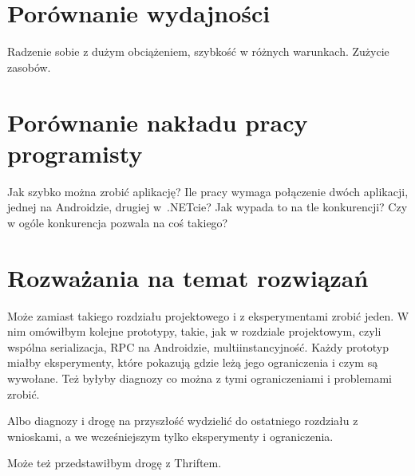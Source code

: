 
\section{Porównanie wydajności}
Radzenie sobie z dużym obciążeniem, szybkość w różnych warunkach. Zużycie zasobów.

\section{Porównanie nakładu pracy programisty}
Jak szybko można zrobić aplikację? Ile pracy wymaga połączenie dwóch aplikacji, jednej na Androidzie, drugiej w~.NETcie? Jak wypada to na tle konkurencji? Czy w ogóle konkurencja pozwala na coś takiego?



\section{Rozważania na temat rozwiązań}
Może zamiast takiego rozdziału projektowego i z eksperymentami zrobić jeden.
W nim omówiłbym kolejne prototypy, takie, jak w rozdziale projektowym, czyli wspólna serializacja, RPC na Androidzie, multiinstancyjność.
Każdy prototyp miałby eksperymenty, które pokazują gdzie leżą jego ograniczenia i czym są wywołane. Też byłyby diagnozy co można z tymi ograniczeniami i problemami zrobić.

Albo diagnozy i drogę na przyszłość wydzielić do ostatniego rozdziału z wnioskami, a we wcześniejszym tylko eksperymenty i ograniczenia.

Może też przedstawiłbym drogę z Thriftem.